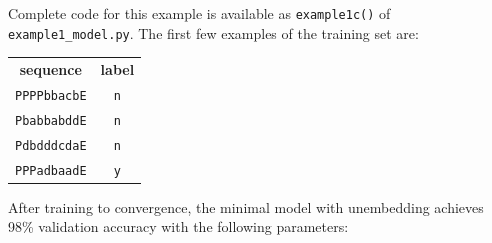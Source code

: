 \documentclass{article}
\begin{document}
Complete code for this example is available as \texttt{example1c()} of
\texttt{example1\_model.py}. The first few examples of the training
set are:
\begin{center}
\begin{tabular}{cc}
  \textbf{sequence} & \textbf{label} \\
  \texttt{PPPPbbacbE} & \texttt{n} \\
  \texttt{PbabbabddE} & \texttt{n} \\
  \texttt{PdbdddcdaE} & \texttt{n} \\
  \texttt{PPPadbaadE} & \texttt{y} \\
\end{tabular}
\end{center}
After training to convergence, the minimal model  with unembedding achieves 98\%
validation accuracy with the following parameters:
\end{document}

